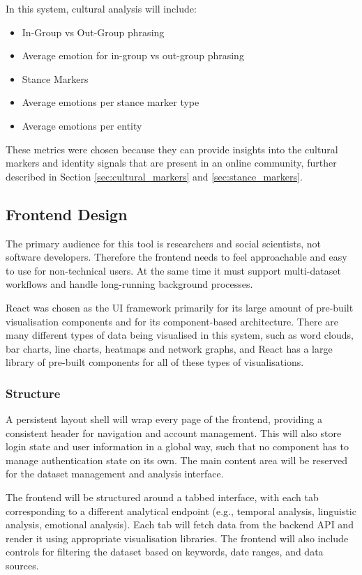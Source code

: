 \documentclass[12pt, a4paper]{article}
\begin{document}
In this system, cultural analysis will include:
\begin{itemize}
    \item In-Group vs Out-Group phrasing 
    \item Average emotion for in-group vs out-group phrasing
    \item Stance Markers
    \item Average emotions per stance marker type
    \item Average emotions per entity
\end{itemize}

These metrics were chosen because they can provide insights into the cultural markers and identity signals that are present in an online community, further described in Section \ref{sec:cultural_markers} and \ref{sec:stance_markers}.

\subsection{Frontend Design}
The primary audience for this tool is researchers and social scientists, not software developers. Therefore the frontend needs to feel approachable and easy to use for non-technical users. At the same time it must support multi-dataset workflows and handle long-running background processes.

React was chosen as the UI framework primarily for its large amount of pre-built visualisation components and for its component-based architecture. There are many different types of data being visualised in this system, such as word clouds, bar charts, line charts, heatmaps and network graphs, and React has a large library of pre-built components for all of these types of visualisations.

\subsubsection{Structure}
A persistent layout shell will wrap every page of the frontend, providing a consistent header for navigation and account management. This will also store login state and user information in a global way, such that no component has to manage authentication state on its own. The main content area will be reserved for the dataset management and analysis interface.

The frontend will be structured around a tabbed interface, with each tab corresponding to a different analytical endpoint (e.g., temporal analysis, linguistic analysis, emotional analysis). Each tab will fetch data from the backend API and render it using appropriate visualisation libraries. The frontend will also include controls for filtering the dataset based on keywords, date ranges, and data sources.
\end{document}
